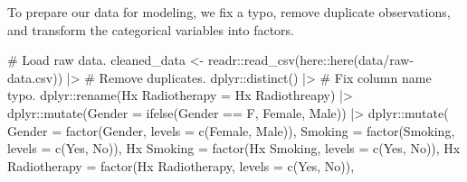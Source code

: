 \documentclass[
  letterpaper,
  DIV=11,
  numbers=noendperiod]{scrartcl}
\newenvironment{Shaded}{\begin{snugshade}}{\end{snugshade}}
\newcommand{\AttributeTok}[1]{\textcolor[rgb]{0.40,0.45,0.13}{#1}}
\newcommand{\CommentTok}[1]{\textcolor[rgb]{0.37,0.37,0.37}{#1}}
\newcommand{\FunctionTok}[1]{\textcolor[rgb]{0.28,0.35,0.67}{#1}}
\newcommand{\NormalTok}[1]{\textcolor[rgb]{0.00,0.23,0.31}{#1}}
\newcommand{\OtherTok}[1]{\textcolor[rgb]{0.00,0.23,0.31}{#1}}
\newcommand{\SpecialCharTok}[1]{\textcolor[rgb]{0.37,0.37,0.37}{#1}}
\newcommand{\StringTok}[1]{\textcolor[rgb]{0.13,0.47,0.30}{#1}}
\begin{document}
To prepare our data for modeling, we fix a typo, remove duplicate
observations, and transform the categorical variables into factors.

\begin{Shaded}
\begin{Highlighting}[]
\CommentTok{\#\textquotesingle{} Load raw data.}
\NormalTok{cleaned\_data }\OtherTok{\textless{}{-}} 
\NormalTok{  readr}\SpecialCharTok{::}\FunctionTok{read\_csv}\NormalTok{(here}\SpecialCharTok{::}\FunctionTok{here}\NormalTok{(}\StringTok{\textquotesingle{}data/raw{-}data.csv\textquotesingle{}}\NormalTok{)) }\SpecialCharTok{|\textgreater{}}
  \CommentTok{\# Remove duplicates.}
\NormalTok{  dplyr}\SpecialCharTok{::}\FunctionTok{distinct}\NormalTok{() }\SpecialCharTok{|\textgreater{}}
  \CommentTok{\# Fix column name typo.}
\NormalTok{  dplyr}\SpecialCharTok{::}\FunctionTok{rename}\NormalTok{(}\StringTok{\textasciigrave{}}\AttributeTok{Hx Radiotherapy}\StringTok{\textasciigrave{}} \OtherTok{=} \StringTok{\textquotesingle{}Hx Radiothreapy\textquotesingle{}}\NormalTok{) }\SpecialCharTok{|\textgreater{}}
\NormalTok{  dplyr}\SpecialCharTok{::}\FunctionTok{mutate}\NormalTok{(}\AttributeTok{Gender =} \FunctionTok{ifelse}\NormalTok{(Gender }\SpecialCharTok{==} \StringTok{\textquotesingle{}F\textquotesingle{}}\NormalTok{, }\StringTok{\textquotesingle{}Female\textquotesingle{}}\NormalTok{, }\StringTok{\textquotesingle{}Male\textquotesingle{}}\NormalTok{)) }\SpecialCharTok{|\textgreater{}}
\NormalTok{  dplyr}\SpecialCharTok{::}\FunctionTok{mutate}\NormalTok{(}
    \AttributeTok{Gender =} \FunctionTok{factor}\NormalTok{(Gender, }\AttributeTok{levels =} \FunctionTok{c}\NormalTok{(}\StringTok{\textquotesingle{}Female\textquotesingle{}}\NormalTok{, }\StringTok{\textquotesingle{}Male\textquotesingle{}}\NormalTok{)),}
    \AttributeTok{Smoking =} \FunctionTok{factor}\NormalTok{(Smoking, }\AttributeTok{levels =} \FunctionTok{c}\NormalTok{(}\StringTok{\textquotesingle{}Yes\textquotesingle{}}\NormalTok{, }\StringTok{\textquotesingle{}No\textquotesingle{}}\NormalTok{)),}
    \StringTok{\textasciigrave{}}\AttributeTok{Hx Smoking}\StringTok{\textasciigrave{}} \OtherTok{=} \FunctionTok{factor}\NormalTok{(}\StringTok{\textasciigrave{}}\AttributeTok{Hx Smoking}\StringTok{\textasciigrave{}}\NormalTok{, }\AttributeTok{levels =} \FunctionTok{c}\NormalTok{(}\StringTok{\textquotesingle{}Yes\textquotesingle{}}\NormalTok{, }\StringTok{\textquotesingle{}No\textquotesingle{}}\NormalTok{)),}
    \StringTok{\textasciigrave{}}\AttributeTok{Hx Radiotherapy}\StringTok{\textasciigrave{}} \OtherTok{=} \FunctionTok{factor}\NormalTok{(}\StringTok{\textasciigrave{}}\AttributeTok{Hx Radiotherapy}\StringTok{\textasciigrave{}}\NormalTok{, }\AttributeTok{levels =} \FunctionTok{c}\NormalTok{(}\StringTok{\textquotesingle{}Yes\textquotesingle{}}\NormalTok{, }\StringTok{\textquotesingle{}No\textquotesingle{}}\NormalTok{)),}

\end{Highlighting}
\end{Shaded}
\end{document}
